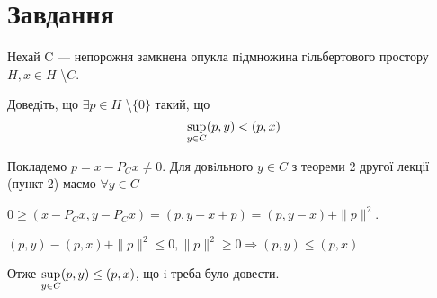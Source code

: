 
\chapter{Завдання \theHchapter}


\begin{tcolorbox}[title=Завдання]
    
    Нехай C — непорожня замкнена опукла пiдмножина гiльбертового 
    простору $ H, x \in H $ \textbackslash $C $.
    
    
    Доведiть, що $ \exists p \in H$ \textbackslash $\{0\} $ такий, що
    $$ \displaystyle\sup_{y \in C} (p, y) < (p, x) $$

    
\end{tcolorbox}



Покладемо $p = x - P_C x \neq 0$. Для довiльного $y \in C$ 
з теореми 2 другої лекції (пункт 2) маємо $ \forall y \in C $


$0 \geq (x - P_C x, y - P_C x)=(p, y - x + p)=(p, y - x) + \|p\| ^2$.


$(p, y) - (p, x) + \|p\| ^2 \le 0, \|p\| ^ 2 \geq 0 \Rightarrow 
(p, y) \le (p, x) $ 


Отже $ \displaystyle\sup_{y \in C} (p, y) \le (p, x) $,
що i треба було довести.

